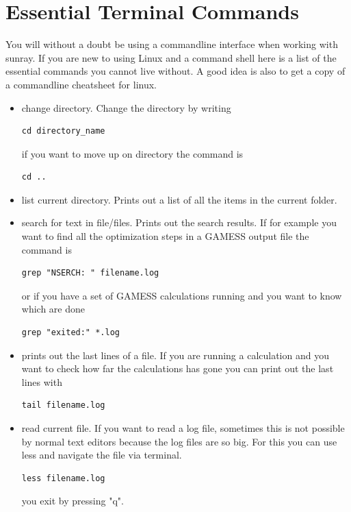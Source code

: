 \documentclass{article}
\begin{document}
\newpage


\section{Essential Terminal Commands}

You will without a doubt be using a commandline interface when working with sunray.
If you are new to using Linux and a command shell here is a list of the essential commands you cannot live without.
A good idea is also to get a copy of a commandline cheatsheet for linux.\\

\begin{itemize}

    \item {} change directory. Change the directory by writing
\begin{lstlisting}
cd directory_name
\end{lstlisting}

        if you want to move up on directory the command is
\begin{lstlisting}
cd ..
\end{lstlisting}

    \item {} list current directory. Prints out a list of all the items in the current folder.

    \item {} search for text in file/files. Prints out the search results. If for example you want to find all the optimization steps in a GAMESS output file the command is
\begin{lstlisting}
grep "NSERCH: " filename.log
\end{lstlisting}
        or if you have a set of GAMESS calculations running and you want to know which are done
\begin{lstlisting}
grep "exited:" *.log
\end{lstlisting}

    \item {} prints out the last lines of a file. 
        If you are running a calculation and you want to check how far the calculations has gone you can print out the last lines with
\begin{lstlisting}
tail filename.log
\end{lstlisting}

    \item {} read current file. If you want to read a log file, sometimes this is not possible by normal text editors because the log files are so big. For this you can use less and navigate the file via terminal.
\begin{lstlisting}
less filename.log
\end{lstlisting}
    you exit by pressing "q".


\end{itemize}
\end{document}
